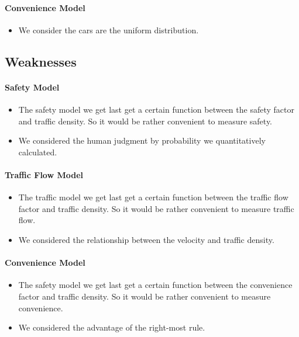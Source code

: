 \paragraph{Convenience Model}
\begin{itemize}
\item We consider the cars are the uniform distribution.
\end{itemize}

\subsection{Weaknesses}
\paragraph{Safety Model}

\begin{itemize}
\item The safety model we get last get a certain function between the safety factor and traffic density. So it would be rather convenient to measure safety.
\item We considered the human judgment by probability we quantitatively calculated.
\end{itemize}

\paragraph{Traffic Flow Model}
\begin{itemize}
\item The traffic model we get last get a certain function between the traffic flow factor and traffic density. So it would be rather convenient to measure traffic flow.
\item We considered the relationship between the velocity and traffic density.
\end{itemize}

\paragraph{Convenience Model}
\begin{itemize}
\item The safety model we get last get a certain function between the convenience factor and traffic density. So it would be rather convenient to measure convenience.
\item We considered the advantage of the right-most rule. 
\end{itemize}

